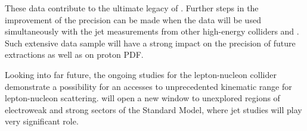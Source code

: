 These data contribute to the ultimate legacy of \hera. Further steps in the improvement of the \asz precision can be made when the \hera data will be used simultaneously with the jet measurements from other high-energy colliders \lhc and \tevatron. Such extensive data sample will have a strong impact on the precision of future \asz extractions as well as on proton PDF.

Looking into far future, the ongoing studies for the lepton-nucleon collider \lhec demonstrate a possibility for an accesses to unprecedented kinematic range for lepton-nucleon scattering. \lhec will open a new window to unexplored regions of electroweak and strong sectors of the Standard Model, where jet studies will play very significant role.



